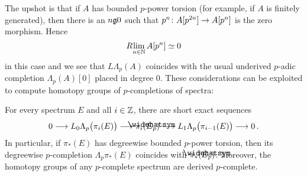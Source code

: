The upshot is that if $A$ has bounded $p$-power torsion (for example, if $A$ is finitely generated), then there is an $n\gge 0$ such that $p^n\colon A[p^{2n}]\morphism A[p^n]$ is the zero morphism. Hence
\begin{equation*}
	R\!\operatorname*{lim}_{n\in\mathbb{N}}A[p^n]\simeq 0
\end{equation*}
in this case and we see that $L\Lambda_p(A)$ coincides with the usual underived $p$-adic completion $\Lambda_p(A)[0]$ placed in degree $0$. These considerations can be exploited to compute homotopy groups of $p$-completions of spectra:
\begin{smalllem}\label{lem:HomotopyOfPCompletion}
	For every spectrum $E$ and all $i\in \mathbb{Z}$, there are short exact sequences
	\begin{equation*}
		0\morphism L_0\Lambda_p\big(\pi_i(E)\big)\morphism \pi_i(\roof{E}_p)\morphism L_1\Lambda_p\big(\pi_{i-1}(E)\big)\morphism 0\,.
	\end{equation*}
	In particular, if $\pi_*(E)$ has degreewise bounded $p$-power torsion, then its degreewise $p$-completion $\Lambda_p\pi_*(E)$ coincides with $\pi_*(\roof{E}_p)$. Moreover, the homotopy groups of any $p$-complete spectrum are derived $p$-complete.
\end{smalllem}

